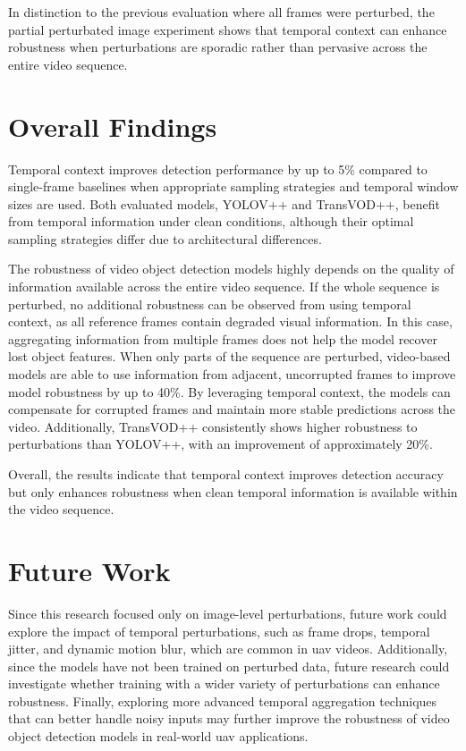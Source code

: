 \documentclass[final,twoside]{vutinfth}
\begin{document}
In distinction to the previous evaluation where all frames were perturbed, the partial perturbated image experiment shows that temporal context can enhance robustness when perturbations are sporadic rather than pervasive across the entire video sequence.
\section{Overall Findings}
Temporal context improves detection performance by up to 5\% compared to single-frame baselines when appropriate sampling strategies and temporal window sizes are used.
Both evaluated models, YOLOV++ and TransVOD++, benefit from temporal information under clean conditions, although their optimal sampling strategies differ due to architectural differences.

The robustness of video object detection models highly depends on the quality of information available across the entire video sequence.
If the whole sequence is perturbed, no additional robustness can be observed from using temporal context, as all reference frames contain degraded visual information.
In this case, aggregating information from multiple frames does not help the model recover lost object features.
When only parts of the sequence are perturbed, video-based models are able to use information from adjacent, uncorrupted frames to improve model robustness by up to 40\%.
By leveraging temporal context, the models can compensate for corrupted frames and maintain more stable predictions across the video.
Additionally, TransVOD++ consistently shows higher robustness to perturbations than YOLOV++, with an improvement of approximately 20\%.

Overall, the results indicate that temporal context improves detection accuracy but only enhances robustness when clean temporal information is available within the video sequence.

\section{Future Work}
Since this research focused only on image-level perturbations, future work could explore the impact of temporal perturbations, such as frame drops, temporal jitter, and dynamic motion blur, which are common in \gls{uav} videos.
Additionally, since the models have not been trained on perturbed data, future research could investigate whether training with a wider variety of perturbations can enhance robustness.
Finally, exploring more advanced temporal aggregation techniques that can better handle noisy inputs may further improve the robustness of video object detection models in real-world \gls{uav} applications.
\end{document}

